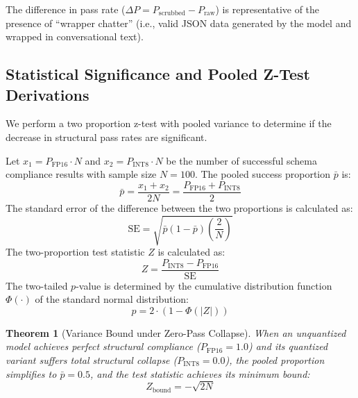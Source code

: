 \documentclass[10pt,journal,compsoc]{IEEEtran}
\newtheorem{theorem}{Theorem}
\begin{document}
The difference in pass rate ($\Delta P = P_{\text{scrubbed}} - P_{\text{raw}}$) is representative of the presence of ``wrapper chatter'' (i.e., valid JSON data generated by the model and wrapped in conversational text).

\subsection{Statistical Significance and Pooled Z-Test Derivations}

We perform a two proportion z-test with pooled variance to determine if the decrease in structural pass rates are significant.

Let $x_1 = P_{\text{FP16}} \cdot N$ and $x_2 = P_{\text{INT8}} \cdot N$ be the number of successful schema compliance results with sample size $N=100$. The pooled success proportion $\bar{p}$ is:
\begin{equation}
    \bar{p} = \frac{x_1 + x_2}{2N} = \frac{P_{\text{FP16}} + P_{\text{INT8}}}{2}
\end{equation}
The standard error of the difference between the two proportions is calculated as:
\begin{equation}
    \text{SE} = \sqrt{ \bar{p}(1 - \bar{p}) \left( \frac{2}{N} \right) }
    \label{eq:pooled_se}
\end{equation}
The two-proportion test statistic $Z$ is calculated as:
\begin{equation}
    Z = \frac{P_{\text{INT8}} - P_{\text{FP16}}}{\text{SE}}
    \label{eq:z_statistic_formula}
\end{equation}
The two-tailed $p$-value is determined by the cumulative distribution function $\Phi(\cdot)$ of the standard normal distribution:
\begin{equation}
    p = 2 \cdot \left( 1 - \Phi(|Z|) \right)
\end{equation}

\begin{theorem}[Variance Bound under Zero-Pass Collapse]
When an unquantized model achieves perfect structural compliance ($P_{\text{FP16}} = 1.0$) and its quantized variant suffers total structural collapse ($P_{\text{INT8}} = 0.0$), the pooled proportion simplifies to $\bar{p} = 0.5$, and the test statistic achieves its minimum bound:
\begin{equation}
    Z_{\text{bound}} = -\sqrt{2N}
    \label{eq:z_bound}
\end{equation}
\end{theorem}
\end{document}
